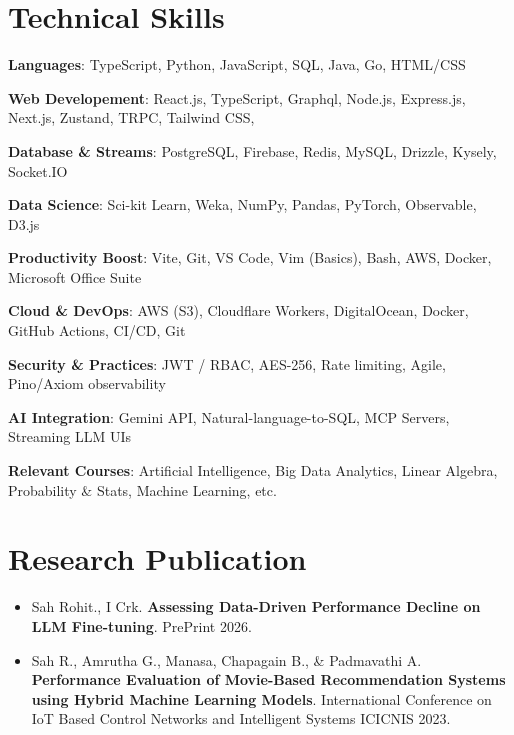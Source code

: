 \documentclass[letter,12pt]{article}
\begin{document}
\section{Technical Skills}
\begin{itemize}[leftmargin=0.15in, label={}]
  \setlength\itemsep{-2pt}


	\small{
        \item{\textbf{Languages}{: TypeScript, Python, JavaScript, SQL, Java, Go, HTML/CSS} \\ 
        }
        \item{
		\textbf{Web Developement}{: React.js, TypeScript, Graphql, Node.js, Express.js, Next.js, Zustand, TRPC, Tailwind CSS, } \\
		}
		\item{
		      \textbf{Database \& Streams}{: PostgreSQL, Firebase, Redis, MySQL, Drizzle, Kysely, Socket.IO} \\
		}
		\item{
		      \textbf{Data Science}{: Sci-kit Learn, Weka, NumPy, Pandas, PyTorch,  Observable, D3.js} \\
		}
		\item{
		      \textbf{Productivity Boost}{: Vite, Git, VS Code, Vim (Basics), Bash, AWS, Docker, Microsoft Office Suite}
		}
            \item{\textbf{Cloud \& DevOps}{: AWS (S3), Cloudflare Workers, DigitalOcean, Docker,
    GitHub Actions, CI/CD, Git}}
        \item{\textbf{Security \& Practices}{: JWT / RBAC, AES-256,
    Rate limiting, Agile, Pino/Axiom observability}}
        \item{\textbf{AI Integration}{: Gemini API, Natural-language-to-SQL, MCP Servers, Streaming LLM UIs}}
		\item{
		      \textbf{Relevant Courses}{: Artificial Intelligence, Big Data Analytics, Linear Algebra, Probability \& Stats, Machine Learning, etc.}
		}
	}

  
\end{itemize}

\section{Research Publication}
\begin{itemize}[leftmargin=0.15in, label={}]
	\setlength\itemsep{-2pt}
	\item{
	      Sah Rohit., I Crk. \textbf{Assessing Data-Driven Performance Decline on LLM Fine-tuning}. PrePrint 2026.
	}
    \item{
	      Sah R., Amrutha G., Manasa, Chapagain B., \& Padmavathi A. \textbf{Performance Evaluation of Movie-Based Recommendation Systems using Hybrid Machine Learning Models}. International Conference on IoT Based Control Networks and Intelligent Systems ICICNIS 2023.
	}
\end{itemize}
\end{document}
